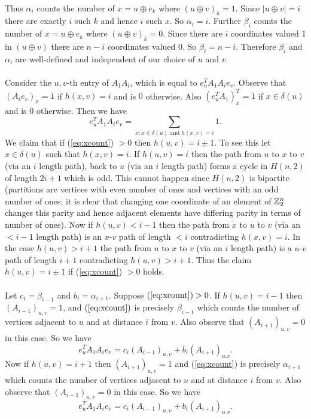 \documentclass[letterpaper,12pt,oneside,onecolumn]{article}
\newcommand{\1}{\mathbbm{1}}
\begin{document}
\paragraph{}
Thus $\alpha_i$ counts the number of $x = u \oplus e_k$ where $(u \oplus v)_k = 1$. Since $|u \oplus v| = i$ there are exactly $i$ such $k$ and hence $i$ such $x$. So $\alpha_i = i$. Further $\beta_i$ counts the number of $x = u \oplus e_k$ where $(u \oplus v)_k = 0$. Since there are $i$ coordinates valued $1$ in $(u\oplus v)$ there are $n-i$ coordinates valued $0$. So $\beta_i = n-i$. Therefore $\beta_i$ and $\alpha_i$ are well-defined and independent of our choice of $u$ and $v$.
\paragraph{}
Consider the $u,v$-th entry of $A_1A_{i}$, which is equal to $e_u^TA_1A_i e_v$. Observe that $(A_ie_v)_x = 1$ if $h(x,v) = i$ and is $0$ otherwise. Also $(e_u^TA_1)^T_x = 1$ if $x \in \delta(u)$ and is $0$ otherwise. Then we have
\begin{equation}e_u^TA_1A_ie_v = \sum_{x : x\in \delta(u)\text{ and } h(x,v) = i}1.\label{eq:xcount}\end{equation}
We claim that if (\ref{eq:xcount}) $> 0$ then $h(u,v) = i \pm 1$. To see this let $x \in \delta(u)$ such that $h(x,v) = i$. If $h(u,v) = i$ then the path from $u$ to $x$ to $v$ (via an $i$ length path), back to $u$ (via an $i$ length path) forms a cycle in $H(n,2)$ of length $2i+1$ which is odd. This cannot happen since $H(n,2)$ is bipartite (partitions are vertices with even number of ones and vertices with an odd number of ones; it is clear that changing one coordinate of an element of $\mathbb{Z}^n_2$ changes this parity and hence adjacent elements have differing parity in terms of number of ones). Now if $h(u,v) < i-1$ then the path from $x$ to $u$ to $v$ (via an $<i-1$ length path) is an $x$-$v$ path of length $< i$ contradicting $h(x,v) = i$. In the case $h(u,v) > i+1$ the path from $u$ to $x$ to $v$ (via an $i$ length path) is a $u$-$v$ path of length $i+1$ contradicting $h(u,v) > i+1$. Thus the claim $h(u,v) = i \pm 1$ if (\ref{eq:xcount}) $>0$ holds.
\paragraph{}
Let $c_i = \beta_{i-1}$ and $b_i = \alpha_{i+1}$. Suppose $(\ref{eq:xcount}) > 0$. If $h(u,v) = i-1$ then $(A_{i-1})_{u,v} = 1$, and $(\ref{eq:xcount})$ is precisely $\beta_{i-1}$ which counts the number of vertices adjacent to $u$ and at distance $i$ from $v$. Also observe that $(A_{i+1})_{u,v} = 0$ in this case. So we have
$$e_u^T A_1 A_i e_v = c_i (A_{i-1})_{u,v} + b_i(A_{i+1})_{u.v}.$$
Now if $h(u,v) = i+1$ then $(A_{i+1})_{u,v} = 1$ and (\ref{eq:xcount}) is precisely $\alpha_{i+1}$ which counts the number of vertices adjacent to $u$ and at distance $i$ from $v$. Also observe that $(A_{i-1})_{u,v} = 0$ in this case. So we have
$$e_u^T A_1 A_i e_v = c_i (A_{i-1})_{u,v} + b_i(A_{i+1})_{u.v}.$$
\end{document}
